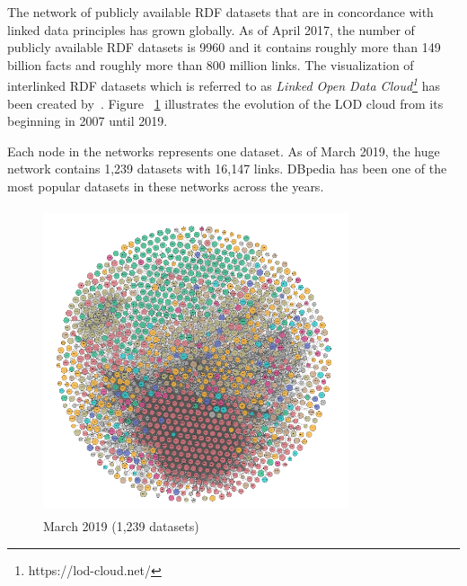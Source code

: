 The network of publicly available RDF datasets that are in concordance with linked data principles has grown globally. As of April 2017, the number of publicly available RDF datasets is 9960 and it contains roughly more than 149 billion facts and roughly more than 800 million links. The visualization of interlinked RDF datasets which is referred to as \textit{Linked Open Data Cloud\footnote{https://lod-cloud.net/}} has been  created by~\cite{LOD_cloud}.  Figure ~\ref{fig:lod_cloud} illustrates the evolution of the LOD cloud from its beginning in 2007 until 2019.  

Each node in the networks represents one dataset. As of March 2019, the huge network contains 1,239 datasets with 16,147 links. DBpedia has been one of the most popular datasets in these networks across the years. 
\newpage

\vspace{10cm}

%
\clearpage

\begin{figure}[t!]
\centering
 \includegraphics[height=9cm,width=9cm]{Figures/LOD/fig_LOD_2019_clean.png}
 \caption{March 2019 (1,239 datasets)}
 \label{fig:lod_cloud}
\end{figure}


